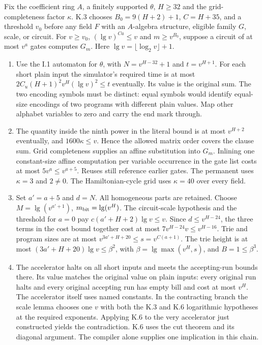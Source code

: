 \clearpage
{}

Fix the coefficient ring $A$, a finitely supported $\theta$, $H\ge32$ and the grid-completeness factor $\kappa$. K.3 chooses $B_0=9(H+2)+1$, $C=H+35$, and a threshold $v_0$ before any field $F$ with an $A$-algebra structure, eligible family $G$, scale, or circuit. For $v\ge v_0$, $(\lg v)^{Ca}\le v$ and $m\ge v^{B_0}$, suppose a circuit of at most $v^a$ gates computes $G_m$. Here $\lg v=\lfloor\log_2v\rfloor+1$.

\begin{enumerate}
\item Use the I.1 automaton for $\theta$, with $N=v^{H-32}+1$ and $t=v^{H+1}$. For each short plain input the simulator's required time is at most $2C_u(H+1)^2v^H(\lg v)^2\le t$ eventually. Its value is the original sum. The two encoding symbols must be distinct: equal symbols would identify equal-size encodings of two programs with different plain values. Map other alphabet variables to zero and carry the end mark through.
\item The quantity inside the ninth power in the literal bound is at most $v^{H+2}$ eventually, and $1600\kappa\le v$. Hence the allowed matrix order covers the clause sum. Grid completeness supplies an affine substitution into $G_m$. Inlining one constant-size affine computation per variable occurrence in the gate list costs at most $5v^a\le v^{a+5}$. Reuses still reference earlier gates. The permanent uses $\kappa=3$ and $2\ne0$. The Hamiltonian-cycle grid uses $\kappa=40$ over every field.
\item Set $a'=a+5$ and $d=N$. All homogeneous parts are retained. Choose $M=\lg(v^{a'+1})$, $m_{\rm bit}=\lg(v^H)$. The circuit-scale hypothesis and the threshold for $a=0$ pay $c(a'+H+2)\lg v\le v$. Since $d\le v^{H-24}$, the three terms in the cost bound together cost at most $7v^{H-24}v\le v^{H-16}$. Trie and program sizes are at most $v^{3a'+H+20}\le s=v^{C(a+1)}$. The trie height is at most $(3a'+H+20)\lg v\le\beta^2$, with $\beta=\lg\max(v^H,s)$, and $B=1\le\beta^3$.
\item The accelerator halts on all short inputs and meets the accepting-run bounds there. Its value matches the original value on plain inputs: every original run halts and every original accepting run has empty bill and cost at most $v^H$. The accelerator itself uses named constants. In the contracting branch the scale lemma chooses one $v$ with both the K.3 and K.6 logarithmic hypotheses at the required exponents. Applying K.6 to the very accelerator just constructed yields the contradiction. K.6 uses the cut theorem and its diagonal argument. The compiler alone supplies one implication in this chain.
\end{enumerate}
